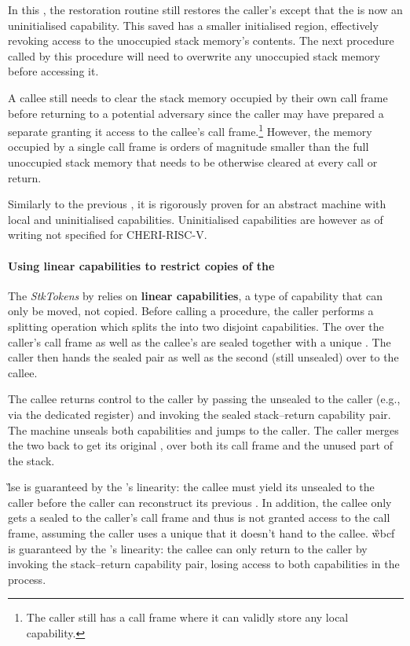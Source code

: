 \documentclass[main.tex]{subfiles}
\begin{document}
In this , the restoration routine still restores the caller's  except that the  is now an uninitialised capability. This saved  has a smaller initialised region, effectively revoking access to the unoccupied stack memory's contents. The next procedure called by this procedure will need to overwrite any unoccupied stack memory before accessing it.

A callee still needs to clear the stack memory occupied by their own call frame before returning to a potential adversary since the caller may have prepared a separate  granting it access to the callee's call frame.\footnote{The caller still has a call frame where it can validly store any local capability.} However, the memory occupied by a single call frame is orders of magnitude smaller than the full unoccupied stack memory that needs to be otherwise cleared at every call or return.

Similarly to the previous , it is rigorously proven for an abstract machine with local and uninitialised capabilities. Uninitialised capabilities are however as of writing not specified for CHERI-RISC-V.

\paragraph{Using linear capabilities to restrict copies of the } The \emph{StkTokens}  by \cite{stktokens} relies on \textbf{linear capabilities}, a type of capability that can only be moved, not copied. Before calling a procedure, the caller performs a splitting operation which splits the  into two disjoint capabilities. The  over the caller's call frame as well as the callee's  are sealed together with a unique . The caller then hands the sealed pair as well as the second (still unsealed)  over to the callee.

The callee returns control to the caller by passing the unsealed  to the caller (e.g., via the dedicated  register) and invoking the sealed stack–return capability pair. The machine unseals both capabilities and jumps to the caller. The caller merges the two  back to get its original , over both its call frame and the unused part of the stack.

\G{lse} is guaranteed by the 's linearity: the callee must yield its unsealed  to the caller before the caller can reconstruct its previous . In addition, the callee only gets a sealed  to the caller's call frame and thus is not granted access to the call frame, assuming the caller uses a unique  that it doesn't hand to the callee. \G{wbcf} is guaranteed by the 's linearity: the callee can only return to the caller by invoking the stack–return capability pair, losing access to both capabilities in the process.
\end{document}
